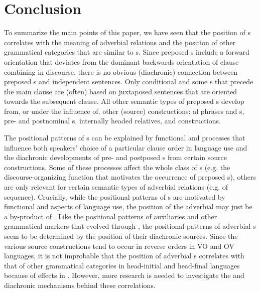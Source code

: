 \documentclass[output=paper]{langsci/langscibook}
\begin{document}
\section{Conclusion}

To summarize the main points of this paper, we have seen that the position of s correlates with the meaning of adverbial relations and the position of other grammatical categories that are similar to s. Since preposed s include a forward orientation that deviates from the dominant backwards orientation of clause combining in discourse, there is no obvious (diachronic) connection between preposed s and independent sentences. Only conditional and some s that precede the main clause are (often) based on juxtaposed sentences that are oriented towards the subsequent clause. All other semantic types of preposed s develop from, or under the influence of, other (source) constructions: al phrases and s, pre- and postnominal s, internally headed relatives, and  constructions.

The positional patterns of s 
\label{p:diessel:preposedadverbialclauses}
can be explained by functional and  processes that influence both speakers’ choice of a particular clause order in language use and the diachronic developments of pre- and postposed s from certain source constructions. Some of these processes affect the whole class of s (e.g. the discourse-organizing function that motivates the occurrence of preposed s), others are only relevant for certain semantic types of adverbial relations (e.g.  of sequence). Crucially, while the positional patterns of s are motivated by functional and  aspects of language use, the position of the adverbial  may just be a by-product of . Like the positional patterns of auxiliaries and other grammatical markers that evolved through , the positional patterns of adverbial s seem to be determined by the position of their diachronic sources. Since the various source constructions tend to occur in reverse orders in VO and OV languages, it is not improbable that the position of adverbial s correlates with that of other grammatical categories in head-initial and head-final languages because of  effects in . However, more research is needed to investigate the  and diachronic mechanisms behind these correlations.
\end{document}

